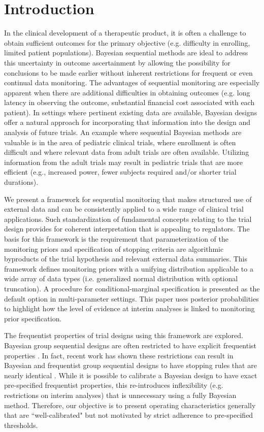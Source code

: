 \documentclass[useAMS,usenatbib,referee]{biom}
\begin{document}
\section{Introduction}
In the clinical development of a therapeutic product, it is often a challenge to obtain sufficient outcomes for the primary objective (e.g. difficulty in enrolling, limited patient populations). Bayesian sequential methods are ideal to address this uncertainty in outcome ascertainment by allowing the possibility for conclusions to be made earlier without inherent restrictions for frequent or even continual data monitoring. The advantages of sequential monitoring are especially apparent when there are additional difficulties in obtaining outcomes (e.g. long latency in observing the outcome, substantial financial cost associated with each patient). In settings where pertinent existing data are available, Bayesian designs offer a natural approach for incorporating that information into the design and analysis of future trials. An example where sequential Bayesian methods are valuable is in the area of pediatric clinical trials, where enrollment is often difficult and where relevant data from adult trials are often available. Utilizing information from the adult trials may result in pediatric trials that are more efficient (e.g., increased power, fewer subjects required and/or shorter trial durations).

We present a framework for sequential monitoring that makes structured use of external data and can be consistently applied to a wide range of clinical trial applications. Such standardization of fundamental concepts relating to the trial design provides for coherent interpretation that is appealing to regulators. The basis for this framework is the requirement that parameterization of the monitoring priors and specification of stopping criteria are algorithmic byproducts of the trial hypothesis and relevant external data summaries. This framework defines monitoring priors with a unifying distribution applicable to a wide array of data types (i.e. generalized normal distribution with optional truncation). A procedure for conditional-marginal specification is presented as the default option in multi-parameter settings. This paper uses posterior probabilities to highlight how the level of evidence at interim analyses is linked to monitoring prior specification. 

The frequentist properties of trial designs using this framework are explored. Bayesian group sequential designs are often restricted to have explicit frequentist properties \citep{Ventz2015, Zhu2015}. In fact, recent work has shown these restrictions can result in Bayesian and frequentist group sequential designs to have stopping rules that are nearly identical \citep{Stallard2020, Kopp-Schneider2019, Zhu2019}.
While it is possible to calibrate a Bayesian design to have exact pre-specified frequentist properties, this re-introduces inflexibility (e.g. restrictions on interim analyses) that is unnecessary using a fully Bayesian method. Therefore, our objective is to present operating characteristics generally that are ``well-calibrated" \citep{Grieve2016} but not motivated by strict adherence to pre-specified thresholds.
\end{document}
